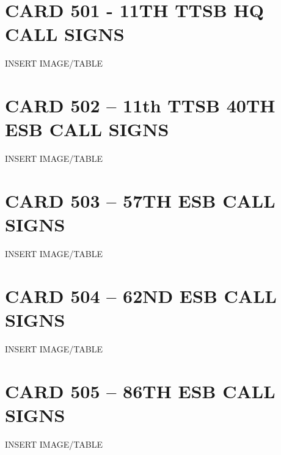 \documentclass{article}
\begin{document}
\newpage
\section*{CARD 501 - 11TH TTSB HQ CALL SIGNS }
INSERT IMAGE/TABLE

\newpage
\section*{CARD 502 – 11th TTSB 40TH ESB CALL SIGNS}
INSERT IMAGE/TABLE

\newpage
\section*{CARD 503 – 57TH ESB CALL SIGNS}
INSERT IMAGE/TABLE

\newpage
\section*{CARD 504 – 62ND ESB CALL SIGNS}
INSERT IMAGE/TABLE

\newpage
\section*{CARD 505 – 86TH ESB CALL SIGNS}
INSERT IMAGE/TABLE

\newpage
\end{document}
